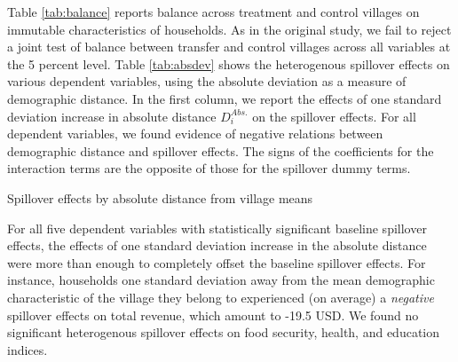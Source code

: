 \documentclass[11pt]{article}
\begin{document}
    Table \ref{tab:balance} reports balance across treatment and control villages on immutable characteristics of households. As in the original study, we fail to reject a joint test of balance between transfer and control villages across all variables at the 5 percent level. Table \ref{tab:absdev} shows the heterogenous spillover effects on various dependent variables, using the absolute deviation as a measure of demographic distance. In the first column, we report the effects of one standard deviation increase in absolute distance  $D_i^{Abs.}$ on the spillover effects. For all dependent variables, we found evidence of negative relations between demographic distance and spillover effects. The signs of the coefficients for the interaction terms are the opposite of those for the spillover dummy terms. \\

    \begin{table}[H]
    \centering
    \caption{Spillover effects by absolute distance from village means}
    \label{tab:absdev}
    \end{table}

    For all five dependent variables with statistically significant baseline spillover effects, the effects of one standard deviation increase in the absolute distance were more than enough to completely offset the baseline spillover effects. For instance, households one standard deviation away from the mean demographic characteristic of the village they belong to experienced (on average) a \textit{negative} spillover effects on total revenue, which amount to -19.5 USD. We found no significant heterogenous spillover effects on food security, health, and education indices.
\end{document}
